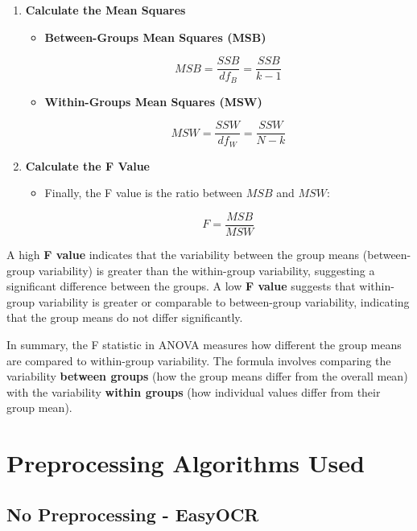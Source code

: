 \documentclass[conference]{IEEEtran}
\begin{document}
\begin{enumerate}
        \item \textbf{Calculate the Mean Squares}
        \begin{itemize}
            \item \textbf{Between-Groups Mean Squares (MSB)}
            
            \[
            MSB = \frac{SSB}{df_B} = \frac{SSB}{k - 1}
            \]
            
            \item \textbf{Within-Groups Mean Squares (MSW)}
            
            \[
            MSW = \frac{SSW}{df_W} = \frac{SSW}{N - k}
            \]
        \end{itemize}
        
        \item \textbf{Calculate the F Value}
        \begin{itemize}
            \item Finally, the F value is the ratio between \( MSB \) and \( MSW \):
            
            \[
            F = \frac{MSB}{MSW}
            \]
        \end{itemize}
    \end{enumerate}
    
    A high \textbf{F value} indicates that the variability between the group means (between-group variability) is greater than the within-group variability, suggesting a significant difference between the groups. A low \textbf{F value} suggests that within-group variability is greater or comparable to between-group variability, indicating that the group means do not differ significantly.
    
    In summary, the F statistic in ANOVA measures how different the group means are compared to within-group variability. The formula involves comparing the variability \textbf{between groups} (how the group means differ from the overall mean) with the variability \textbf{within groups} (how individual values differ from their group mean).
    
    \section{Preprocessing Algorithms Used}
    
    \subsection{No Preprocessing - EasyOCR}
    
\end{document}
